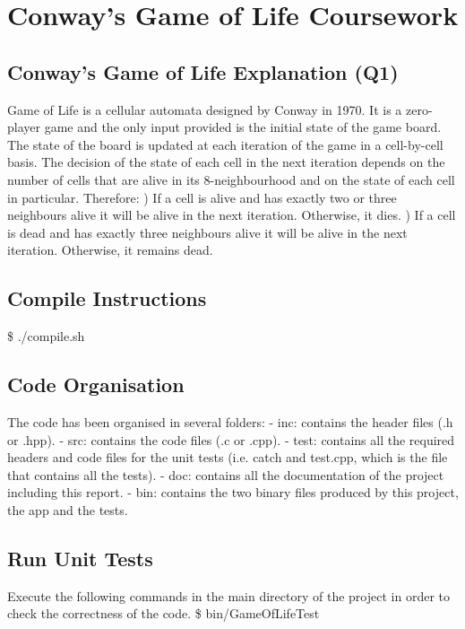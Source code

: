 \documentclass[a4paper,12pt,twoside]{report}
\author{Luis Carlos Garcia-Peraza Herrera}
\date{\today}
\begin{document}
\chapter*{Conway's Game of Life Coursework}
\section*{Conway's Game of Life Explanation (Q1)}
	
Game of Life is a cellular automata designed by Conway in 1970. It is a zero-player game and the only input provided is the initial state of the game board.
The state of the board is updated at each iteration of the game in a cell-by-cell basis. The decision of the state of each cell in the next iteration depends
on the number of cells that are alive in its 8-neighbourhood and on the state of each cell in particular. Therefore:
\newline{}) If a cell is alive and has exactly two or three neighbours alive it will be alive in the next iteration. Otherwise, it dies.
\newline{}) If a cell is dead and has exactly three neighbours alive it will be alive in the next iteration. Otherwise, it remains dead.

\section*{Compile Instructions}
\$ ./compile.sh
\section*{Code Organisation}
The code has been organised in several folders: \newline
- inc: contains the header files (.h or .hpp). \newline
- src: contains the code files (.c or .cpp). \newline
- test: contains all the required headers and code files for the unit tests (i.e. catch and test.cpp, which is the file that contains all the tests). \newline
- doc: contains all the documentation of the project including this report. \newline
- bin: contains the two binary files produced by this project, the app and the tests.
\section*{Run Unit Tests}
Execute the following commands in the main directory of the project in order to check the correctness of the code. \newline
\newline
\$ bin/GameOfLifeTest
\end{document}
